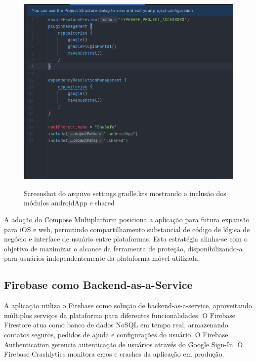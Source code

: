 \begin{figure}[H]
	\centering
	\includegraphics[width=0.8\linewidth]{images/shesafe/settings-gradle.png}\\
	\caption{Screenshot do arquivo settings.gradle.kts mostrando a inclusão dos módulos androidApp e shared}
	\label{fig:settings_gradle}
\end{figure}
A adoção do Compose Multiplatform posiciona a aplicação para futura expansão para iOS e web, permitindo compartilhamento substancial de código de lógica de negócio e interface de usuário entre plataformas. Esta estratégia alinha-se com o objetivo de maximizar o alcance da ferramenta de proteção, disponibilizando-a para usuários independentemente da plataforma móvel utilizada.

\subsection{Firebase como Backend-as-a-Service}
A aplicação utiliza o Firebase como solução de backend-as-a-service, aproveitando múltiplos serviços da plataforma para diferentes funcionalidades. O Firebase Firestore atua como banco de dados NoSQL em tempo real, armazenando contatos seguros, pedidos de ajuda e configurações do usuário. O Firebase Authentication gerencia autenticação de usuários através do Google Sign-In. O Firebase Crashlytics monitora erros e crashes da aplicação em produção.

